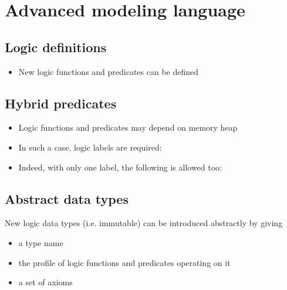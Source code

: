 \documentclass[a4paper,11pt,twoside,openright]{report}
\begin{document}
\section{Advanced modeling language}
\label{sec:logicspec}

\subsection{Logic definitions}

  \begin{itemize}
  \item New logic functions and predicates can be defined
  \end{itemize}

\subsection{Hybrid predicates}
\label{sec:logicalstates}

  \begin{itemize}
  \item Logic functions and predicates may depend on memory heap
  \item In such a case, logic labels are required:
  \item Indeed, with only one label, the following is allowed too:
  \end{itemize}

\subsection{Abstract data types}

  New logic data types (i.e. immutable) can be introduced abstractly
  by giving
  \begin{itemize}
  \item a type name
  \item the profile of logic functions and predicates operating on it
  \item a set of axioms
  \end{itemize}



\end{document}

